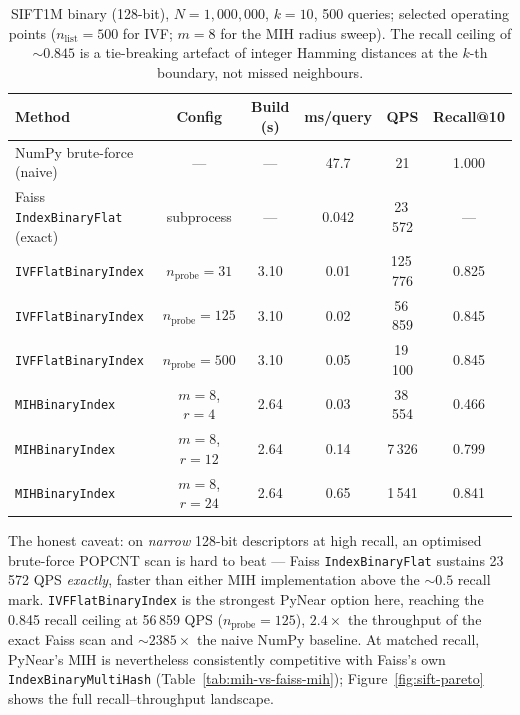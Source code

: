 \documentclass[11pt,a4paper]{article}
\begin{document}
\begin{table}[h]
\centering
\caption{SIFT1M binary (128-bit), $N=1{,}000{,}000$, $k=10$, 500 queries;
  selected operating points ($n_{\mathrm{list}} = 500$ for IVF; $m=8$ for
  the MIH radius sweep).  The recall ceiling of ${\sim}0.845$
  is a tie-breaking artefact of integer Hamming distances at the $k$-th
  boundary, not missed neighbours.}
\label{tab:binary-sift}
\renewcommand{\arraystretch}{1.25}
\footnotesize
\begin{tabular}{lccccc}
\toprule
\textbf{Method} & \textbf{Config} & \textbf{Build (s)} & \textbf{ms/query} & \textbf{QPS} & \textbf{Recall@10} \\
\midrule
NumPy brute-force (naive) & — & — & 47.7 & 21 & 1.000 \\
Faiss \texttt{IndexBinaryFlat} (exact) & subprocess & — & 0.042 & 23\,572 & — \\
\texttt{IVFFlatBinaryIndex} & $n_{\mathrm{probe}}=31$ & 3.10 & 0.01 & 125\,776 & 0.825 \\
\texttt{IVFFlatBinaryIndex} & $n_{\mathrm{probe}}=125$ & 3.10 & 0.02 & 56\,859 & 0.845 \\
\texttt{IVFFlatBinaryIndex} & $n_{\mathrm{probe}}=500$ & 3.10 & 0.05 & 19\,100 & 0.845 \\
\texttt{MIHBinaryIndex} & $m=8$, $r=4$ & 2.64 & 0.03 & 38\,554 & 0.466 \\
\texttt{MIHBinaryIndex} & $m=8$, $r=12$ & 2.64 & 0.14 & 7\,326 & 0.799 \\
\texttt{MIHBinaryIndex} & $m=8$, $r=24$ & 2.64 & 0.65 & 1\,541 & 0.841 \\
\bottomrule
\end{tabular}
\end{table}

The honest caveat: on \emph{narrow} 128-bit descriptors at high recall, an
optimised brute-force POPCNT scan is hard to beat — Faiss
\texttt{IndexBinaryFlat} sustains 23\,572 QPS \emph{exactly}, faster than
either MIH implementation above the ${\sim}0.5$ recall mark.
\texttt{IVFFlatBinaryIndex} is the strongest PyNear option here, reaching
the 0.845 recall ceiling at 56\,859 QPS ($n_{\mathrm{probe}}=125$),
$2.4\times$ the throughput of the exact Faiss scan and ${\sim}2385\times$
the naive NumPy baseline.  At matched recall, PyNear's MIH is nevertheless
consistently competitive with Faiss's own \texttt{IndexBinaryMultiHash}
(Table~\ref{tab:mih-vs-faiss-mih}); Figure~\ref{fig:sift-pareto} shows the
full recall--throughput landscape.
\end{document}

